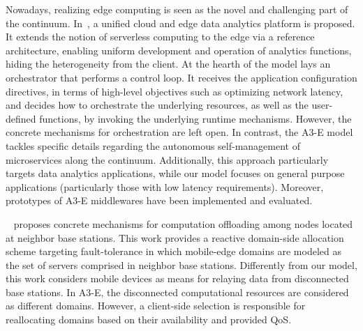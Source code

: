 Nowadays, realizing edge computing is seen as the novel and challenging part of the continuum. In~\cite{Nastic17ServerlessDataAnalytics}, a unified cloud and edge data analytics platform is proposed. It extends the notion of serverless computing to the edge via a reference architecture, enabling uniform development and operation of analytics functions, hiding the heterogeneity from the client. At the hearth of the model lays an orchestrator that performs a control loop. It receives the application configuration directives, in terms of high-level objectives such as optimizing network latency, and decides how to orchestrate the underlying resources, as well as the user-defined functions, by invoking
the underlying runtime mechanisms. However, the concrete mechanisms for orchestration are left open. In contrast, the A3-E model tackles specific details regarding the autonomous self-management of  microservices along the continuum. Additionally, this approach particularly targets data analytics applications, while our model focuses on general purpose applications (particularly those with low latency requirements). Moreover, prototypes of A3-E middlewares have been implemented and evaluated. 



~\cite{Satria2017mec} proposes concrete mechanisms for computation offloading among nodes located at neighbor base stations. This work provides a reactive domain-side allocation scheme targeting fault-tolerance in which mobile-edge domains are modeled as the set of servers comprised in neighbor base stations. Differently from our model, this work considers mobile devices as means for relaying data from disconnected base stations. In A3-E, the disconnected computational resources are considered as different domains. However, a client-side selection is responsible for reallocating domains based on their availability and provided QoS. 

